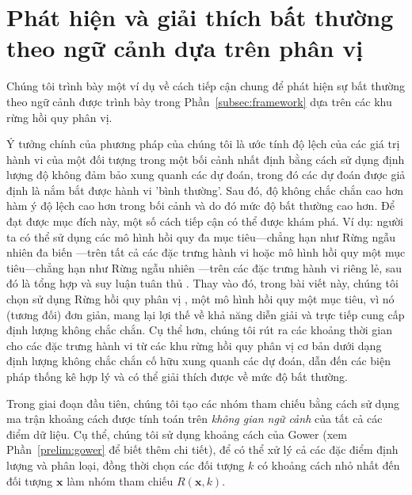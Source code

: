 \section{Phát hiện và giải thích bất thường theo ngữ cảnh dựa trên phân vị}
\label{sec:qcad}

Chúng tôi trình bày một ví dụ về cách tiếp cận chung để phát hiện sự bất thường theo ngữ cảnh được trình bày trong Phần~\ref{subsec:framework} dựa trên các khu rừng hồi quy phân vị.

Ý tưởng chính của phương pháp của chúng tôi là ước tính độ lệch của các giá trị hành vi của một đối tượng trong một bối cảnh nhất định bằng cách sử dụng định lượng độ không đảm bảo xung quanh các dự đoán, trong đó các dự đoán được giả định là nắm bắt được hành vi 'bình thường'. Sau đó, độ không chắc chắn cao hơn hàm ý độ lệch cao hơn trong bối cảnh và do đó mức độ bất thường cao hơn. Để đạt được mục đích này, một số cách tiếp cận có thể được khám phá. Ví dụ: người ta có thể sử dụng các mô hình hồi quy đa mục tiêu---chẳng hạn như Rừng ngẫu nhiên đa biến \citep{segal2011multivariate}---trên tất cả các đặc trưng hành vi hoặc mô hình hồi quy một mục tiêu---chẳng hạn như Rừng ngẫu nhiên \citep{breiman2001random}---trên các đặc trưng hành vi riêng lẻ, sau đó là tổng hợp và suy luận tuân thủ \citep{lei2018distribution}. Thay vào đó, trong bài viết này, chúng tôi chọn sử dụng Rừng hồi quy phân vị \citep{meinshausen2006quantile}, một mô hình hồi quy một mục tiêu, vì nó (tương đối) đơn giản, mang lại lợi thế về khả năng diễn giải và trực tiếp cung cấp định lượng không chắc chắn. Cụ thể hơn, chúng tôi rút ra các khoảng thời gian cho các đặc trưng hành vi từ các khu rừng hồi quy phân vị cơ bản dưới dạng định lượng không chắc chắn cố hữu xung quanh các dự đoán, dẫn đến các biện pháp thống kê hợp lý và có thể giải thích được về mức độ bất thường.

Trong giai đoạn đầu tiên, chúng tôi tạo các nhóm tham chiếu bằng cách sử dụng ma trận khoảng cách được tính toán trên \emph{không gian ngữ cảnh} của tất cả các điểm dữ liệu. Cụ thể, chúng tôi sử dụng khoảng cách \citep{gower1971general} của Gower (xem Phần~\ref{prelim:gower} để biết thêm chi tiết), để có thể xử lý cả các đặc điểm định lượng và phân loại, đồng thời chọn các đối tượng $k$ có khoảng cách nhỏ nhất đến đối tượng $\mathbf{x}$ làm nhóm tham chiếu $R(\mathbf{x}, k)$.

